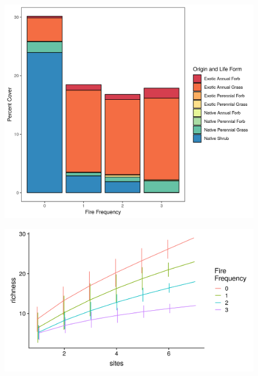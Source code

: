\documentclass[]{article}
\begin{document}
\clearpage

\newpage

\begin{figure}
 
  \begin{center}
    \includegraphics{figures/origin_lf.png}
    \caption{}
  \end{center}
\end{figure}

\clearpage
\newpage

\begin{figure}
 
  \begin{center}
    \includegraphics{figures/sac_plot.png}
    \caption{}
  \end{center}
\end{figure}
\end{document}
